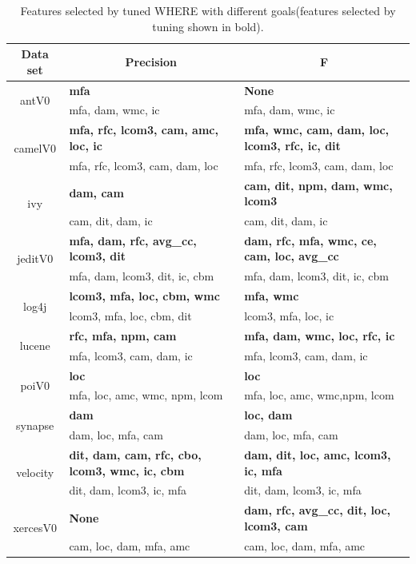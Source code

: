 \documentclass{sig-alternative}
\begin{document}
\begin{table}[!ht]

\renewcommand{\baselinestretch}{0.8}
\scriptsize
\centering
  \begin{tabular}{c|l|l}
    \multicolumn{1}{c|}{ Data set}  &   \multicolumn{1}{c|}{Precision} & \multicolumn{1}{c}{F} \\ \hline
  \multirow{2}{*}{antV0} & {\bf mfa} &  {\bf None} \\
         & mfa, dam, wmc, ic & mfa, dam, wmc, ic\\
  \hline
 \multirow{2}{*}{camelV0} & {\bf mfa, rfc, lcom3, cam, amc, loc, ic} &{\bf  mfa, wmc, cam, dam, loc, lcom3, rfc, ic, dit }\\
        & mfa, rfc, lcom3, cam, dam, loc & mfa, rfc, lcom3, cam, dam, loc\\
  \hline
 \multirow{2}{*}{ivy} & {\bf dam, cam} &{\bf  cam, dit, npm, dam, wmc, lcom3 }  \\
       & cam, dit, dam, ic & cam, dit, dam, ic \\
  \hline
 \multirow{2}{*}{jeditV0} &{\bf  mfa, dam, rfc, avg\_cc, lcom3, dit }&{\bf  dam, rfc, mfa, wmc, ce, cam, loc, avg\_cc}\\
         & mfa, dam, lcom3, dit, ic, cbm & mfa, dam, lcom3, dit, ic, cbm \\
  \hline
 \multirow{2}{*}{log4j} & {\bf lcom3, mfa, loc, cbm, wmc }&{\bf  mfa, wmc}\\
         & lcom3, mfa, loc, cbm, dit & lcom3, mfa, loc, ic \\
   \hline
  \multirow{2}{*}{lucene} & {\bf rfc, mfa, npm, cam} & {\bf mfa, dam, wmc, loc, rfc, ic}\\
         & mfa, lcom3, cam, dam, ic & mfa, lcom3, cam, dam, ic\\
   \hline
   \multirow{2}{*}{poiV0} & {\bf loc }& {\bf loc} \\
        & mfa, loc, amc, wmc, npm, lcom & mfa, loc, amc, wmc,npm, lcom\\
   \hline
   \multirow{2}{*}{synapse} &{\bf  dam} & {\bf loc, dam} \\
        & dam, loc, mfa, cam & dam, loc, mfa, cam\\
    \hline
   \multirow{2}{*}{velocity} & {\bf dit, dam, cam, rfc, cbo, lcom3, wmc, ic, cbm }& {\bf dam, dit, loc, amc, lcom3, ic, mfa }\\
        & dit, dam, lcom3, ic, mfa  & dit, dam, lcom3, ic, mfa\\
    \hline
   \multirow{2}{*}{xercesV0} &{\bf  None }&{\bf  dam, rfc, avg\_cc, dit, loc, lcom3, cam }\\
        & cam, loc, dam, mfa, amc &  cam, loc, dam, mfa, amc \\
    \hline
    
  \end{tabular}
  
    \caption{Features selected by tuned WHERE with different goals(features selected by tuning shown in bold). 
    }\label{tab:features}
\end{table}
\end{document}
